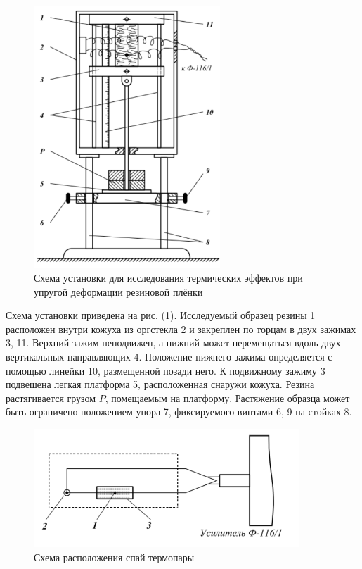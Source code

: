 \documentclass[a4paper,11.5pt]{article} %
\begin{document}
\begin{figure}[h]
    \centering
    \includegraphics[width=7cm]{shit.PNG}
    \caption{Схема установки для исследования термических эффектов при упругой деформации резиновой плёнки}
    \label{fig:vac1}
\end{figure}

Схема установки приведена на рис. (\ref{fig:vac1}). Исследуемый образец резины 1 расположен внутри кожуха из оргстекла 2 и закреплен по торцам в двух зажимах 3, 11. Верхний зажим неподвижен, а нижний может перемещаться вдоль двух вертикальных направляющих 4. Положение нижнего зажима определяется с помощью линейки 10, размещенной позади него. К подвижному
зажиму 3 подвешена легкая платформа 5, расположенная снаружи кожуха. Резина растягивается грузом $P$, помещаемым на платформу. Растяжение образца может быть ограничено положением упора 7, фиксируемого винтами 6, 9 на стойках 8.

\begin{figure}[t]
    \centering
    \includegraphics[width=10cm]{shit2.PNG}
    \caption{Схема расположения спай термопары}
    \label{fig:vac21}
\end{figure}
\end{document}
